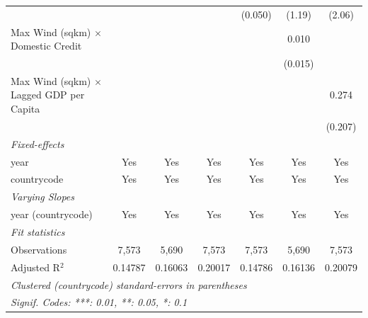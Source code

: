 \begin{tabular}{lcccccc}
                                                    &         &                         &                & (0.050) & (1.19)                  & (2.06)\\   
   Max Wind (sqkm) $\times$ Domestic Credit         &         &                         &                &         & 0.010                   &   \\   
                                                    &         &                         &                &         & (0.015)                 &   \\   
   Max Wind (sqkm) $\times$ Lagged GDP per Capita   &         &                         &                &         &                         & 0.274\\   
                                                    &         &                         &                &         &                         & (0.207)\\   
   \midrule
   \emph{Fixed-effects}\\
   year                                             & Yes     & Yes                     & Yes            & Yes     & Yes                     & Yes\\  
   countrycode                                      & Yes     & Yes                     & Yes            & Yes     & Yes                     & Yes\\  
   \midrule
   \emph{Varying Slopes}\\
   year (countrycode)                               & Yes     & Yes                     & Yes            & Yes     & Yes                     & Yes\\  
   \midrule
   \emph{Fit statistics}\\
   Observations                                     & 7,573   & 5,690                   & 7,573          & 7,573   & 5,690                   & 7,573\\  
   Adjusted R$^2$                                   & 0.14787 & 0.16063                 & 0.20017        & 0.14786 & 0.16136                 & 0.20079\\  
   \midrule \midrule
   \multicolumn{7}{l}{\emph{Clustered (countrycode) standard-errors in parentheses}}\\
   \multicolumn{7}{l}{\emph{Signif. Codes: ***: 0.01, **: 0.05, *: 0.1}}\\
\end{tabular}
\par\endgroup


